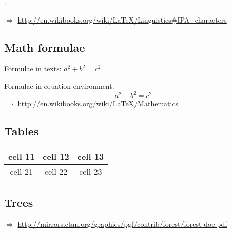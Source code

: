 \ex. 

$\Rightarrow$ \url{http://en.wikibooks.org/wiki/LaTeX/Linguistics#IPA_characters}

\subsection{Math formulae}

Formulae in texts: $a^2 + b^2 = c^2$

\noindent Formulae in equation environment:
\begin{equation}
a^2 + b^2 = c^2
\end{equation}
$\Rightarrow$ \url{http://en.wikibooks.org/wiki/LaTeX/Mathematics}

\subsection{Tables}

\begin{tabular}{c|c|c}
\hline
cell 11 & cell 12 & cell 13 \\
\hline
cell 21 & cell 22 & cell 23 \\
\hline
\end{tabular}

\subsection{Trees}


\noindent $\Rightarrow$ \url{http://mirrors.ctan.org/graphics/pgf/contrib/forest/forest-doc.pdf}
